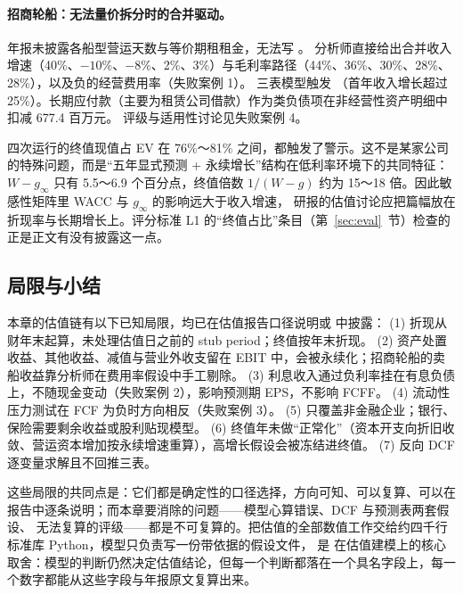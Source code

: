 \paragraph{招商轮船：无法量价拆分时的合并驱动。} 年报未披露各船型营运天数与等价期租租金，无法写 。
分析师直接给出合并收入增速（40\%、$-10\%$、$-8\%$、2\%、3\%）与毛利率路径（44\%、36\%、30\%、28\%、28\%），以及负的经营费用率（失败案例 1）。
三表模型触发 （首年收入增长超过 25\%）。长期应付款（主要为租赁公司借款）作为类负债项在非经营性资产明细中扣减 677.4 百万元。
评级与适用性讨论见失败案例 4。

\begin{insight}[：终值占比在四家公司中都超过 75\%]
四次运行的终值现值占 EV 在 76\%～81\% 之间，都触发了警示。这不是某家公司的特殊问题，而是“五年显式预测 + 永续增长”结构在低利率环境下的共同特征：
$W-g_\infty$ 只有 5.5～6.9 个百分点，终值倍数 $1/(W-g)$ 约为 15～18 倍。因此敏感性矩阵里 WACC 与 $g_\infty$ 的影响远大于收入增速，
研报的估值讨论应把篇幅放在折现率与长期增长上。评分标准 L1 的“终值占比”条目（第~\ref{sec:eval}~节）检查的正是正文有没有披露这一点。
\end{insight}

\subsection{局限与小结}
\label{sec:val-summary}

本章的估值链有以下已知局限，均已在估值报告口径说明或  中披露：
(1) 折现从财年末起算，未处理估值日之前的 stub period；终值按年末折现。
(2) 资产处置收益、其他收益、减值与营业外收支留在 EBIT 中，会被永续化；招商轮船的卖船收益靠分析师在费用率假设中手工剔除。
(3) 利息收入通过负利率挂在有息负债上，不随现金变动（失败案例 2），影响预测期 EPS，不影响 FCFF。
(4) 流动性压力测试在 FCF 为负时方向相反（失败案例 3）。
(5) 只覆盖非金融企业；银行、保险需要剩余收益或股利贴现模型。
(6) 终值年未做“正常化”（资本开支向折旧收敛、营运资本增加按永续增速重算），高增长假设会被冻结进终值。
(7) 反向 DCF 逐变量求解且不回推三表。

这些局限的共同点是：它们都是确定性的口径选择，方向可知、可以复算、可以在报告中逐条说明；而本章要消除的问题——模型心算错误、DCF 与预测表两套假设、
无法复算的评级——都是不可复算的。把估值的全部数值工作交给约四千行标准库 Python，模型只负责写一份带依据的假设文件，
是 \sysname{} 在估值建模上的核心取舍：模型的判断仍然决定估值结论，但每一个判断都落在一个具名字段上，每一个数字都能从这些字段与年报原文复算出来。
